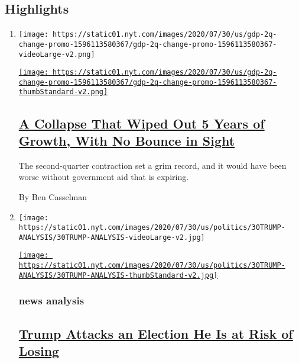 \hypertarget{highlights}{%
\subsection{Highlights}\label{highlights}}

\begin{enumerate}
\def\labelenumi{\arabic{enumi}.}
\item
  \texttt{[image: https://static01.nyt.com/images/2020/07/30/us/gdp-2q-change-promo-1596113580367/gdp-2q-change-promo-1596113580367-videoLarge-v2.png]}

  \href{/2020/07/30/business/economy/q2-gdp-coronavirus-economy.html}{\texttt{[image: https://static01.nyt.com/images/2020/07/30/us/gdp-2q-change-promo-1596113580367/gdp-2q-change-promo-1596113580367-thumbStandard-v2.png]}}

  \hypertarget{a-collapse-that-wiped-out-5-years-of-growth-with-no-bounce-in-sight}{%
  \subsection{\texorpdfstring{\href{/2020/07/30/business/economy/q2-gdp-coronavirus-economy.html}{A
  Collapse That Wiped Out 5 Years of Growth, With No Bounce in
  Sight}}{A Collapse That Wiped Out 5 Years of Growth, With No Bounce in Sight}}\label{a-collapse-that-wiped-out-5-years-of-growth-with-no-bounce-in-sight}}

  The second-quarter contraction set a grim record, and it would have
  been worse without government aid that is expiring.

  By Ben Casselman
\item
  \texttt{[image: https://static01.nyt.com/images/2020/07/30/us/politics/30TRUMP-ANALYSIS/30TRUMP-ANALYSIS-videoLarge-v2.jpg]}

  \href{/2020/07/30/us/politics/trump-delay-election.html}{\texttt{[image: https://static01.nyt.com/images/2020/07/30/us/politics/30TRUMP-ANALYSIS/30TRUMP-ANALYSIS-thumbStandard-v2.jpg]}}

  \hypertarget{news-analysis}{%
  \subsubsection{news analysis}\label{news-analysis}}

  \hypertarget{trump-attacks-an-election-he-is-at-risk-of-losing}{%
  \subsection{\texorpdfstring{\href{/2020/07/30/us/politics/trump-delay-election.html}{Trump
  Attacks an Election He Is at Risk of
  Losing}}{Trump Attacks an Election He Is at Risk of Losing}}\label{trump-attacks-an-election-he-is-at-risk-of-losing}}


\end{enumerate}
